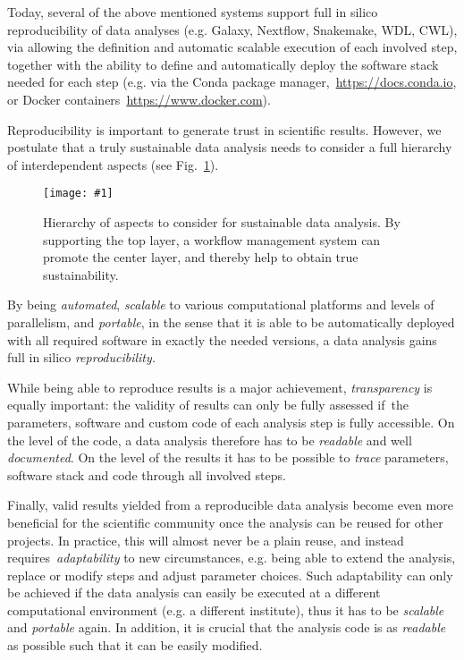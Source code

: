 \documentclass[parskip=half]{scrartcl}
\newcommand{\image}[1]{\centering\texttt{[image: \#1]}}
\let\plainurl\url
\renewcommand{\url}[1]{\protect\plainurl{#1}}
\begin{document}
Today, several of the above mentioned systems support full in silico reproducibility of data analyses (e.g. Galaxy, Nextflow, Snakemake, WDL, CWL), via allowing the definition and automatic scalable execution of each involved step, together with the ability to define and automatically deploy the software stack needed for each step (e.g. via the Conda package manager,~\url{https://docs.conda.io}, or Docker containers~\url{https://www.docker.com}).

Reproducibility is important to generate trust in scientific results.
However, we postulate that a truly sustainable data analysis needs to consider a full hierarchy of interdependent aspects (see Fig.~\ref{fig:sustainability}).

\begin{figure}
	\image{sustainability-in-wms.pdf}
	\caption{
		Hierarchy of aspects to consider for sustainable data analysis.
		By supporting the top layer, a workflow management system can promote the center layer, and thereby help to obtain true sustainability.
	}\label{fig:sustainability}
\end{figure}

By being \emph{automated}, \emph{scalable} to various computational platforms and levels of parallelism, and \emph{portable}, in the sense that it is able to be automatically deployed with all required software in exactly the needed versions, a data analysis gains full in silico \emph{reproducibility.
}

While being able to reproduce results is a major achievement, \emph{transparency} is equally important: the validity of results can only be fully assessed if~the parameters, software and custom code of each analysis step is fully accessible.
On the level of the code, a data analysis therefore has to be \emph{readable} and well \emph{documented}.
On the level of the results it has to be possible to \emph{trace} parameters, software stack and code through all involved steps.

Finally, valid results yielded from a reproducible data analysis become even more beneficial for the scientific community once the analysis can be reused for other projects.
In practice, this will almost never be a plain reuse, and instead requires~\emph{adaptability} to new circumstances, e.g. being able to extend the analysis, replace or modify steps and adjust parameter choices.
Such adaptability can only be achieved if the data analysis can easily be executed at a different computational environment (e.g. a different institute), thus it has to be \emph{scalable} and \emph{portable} again.
In addition, it is crucial that the analysis code is as \emph{readable} as possible such that it can be easily modified.
\end{document}
